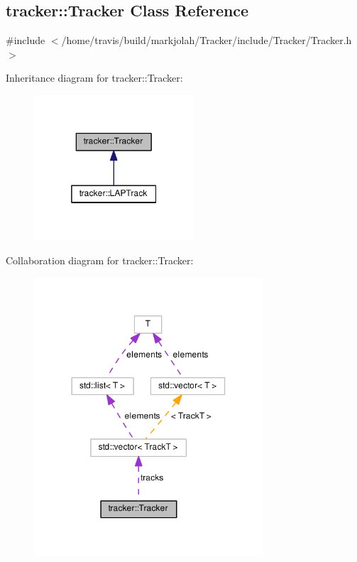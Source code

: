 \hypertarget{classtracker_1_1Tracker}{}\subsection{tracker\+:\+:Tracker Class Reference}
\label{classtracker_1_1Tracker}


{\ttfamily \#include $<$/home/travis/build/markjolah/\+Tracker/include/\+Tracker/\+Tracker.\+h$>$}



Inheritance diagram for tracker\+:\+:Tracker\+:\nopagebreak
\begin{figure}[H]
\begin{center}
\leavevmode
\includegraphics[width=169pt]{classtracker_1_1Tracker__inherit__graph}
\end{center}
\end{figure}


Collaboration diagram for tracker\+:\+:Tracker\+:\nopagebreak
\begin{figure}[H]
\begin{center}
\leavevmode
\includegraphics[width=242pt]{classtracker_1_1Tracker__coll__graph}
\end{center}
\end{figure}
